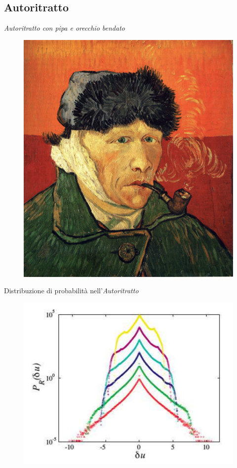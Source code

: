 \documentclass[11pt]{beamer}
\begin{document}
\subsection{Autoritratto}

\begin{frame}{\emph{Autoritratto con pipa e orecchio bendato}}
\begin{figure}
\centering
\includegraphics[scale=0.08]{selfportrait.jpg}
\end{figure}
\end{frame}

\begin{frame}{Distribuzione di probabilità nell'\emph{Autoritratto}}
\begin{figure}
\centering
\includegraphics[scale=0.3]{PDF_self_portrait.png}
\end{figure}
\end{frame}
\end{document}
